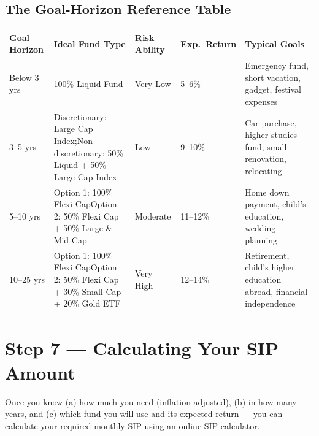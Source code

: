 \documentclass[12pt,a4paper]{article}
\begin{document}
\vspace{3mm}

\subsection{The Goal-Horizon Reference Table}

\begin{center}
\renewcommand{\arraystretch}{1.4}
\begin{tabular}{B{2.4cm} L{4.8cm} L{1.9cm} L{1.8cm} L{3.4cm}}
\toprule
\textbf{Goal Horizon} & \textbf{Ideal Fund Type} & \textbf{Risk Ability} & \textbf{Exp.\ Return} & \textbf{Typical Goals}\\
\midrule
{}
Below 3 yrs
& 100\% Liquid Fund
& Very Low
& 5--6\%
& Emergency fund, short vacation, gadget, festival expenses\\[3pt]

3--5 yrs
& Discretionary: Large Cap Index;\newline Non-discretionary: 50\% Liquid + 50\% Large Cap Index
& Low
& 9--10\%
& Car purchase, higher studies fund, small renovation, relocating\\[3pt]

5--10 yrs
& Option 1: 100\% Flexi Cap\newline Option 2: 50\% Flexi Cap + 50\% Large \& Mid Cap
& Moderate
& 11--12\%
& Home down payment, child's education, wedding planning\\[3pt]

10--25 yrs
& Option 1: 100\% Flexi Cap\newline Option 2: 50\% Flexi Cap + 30\% Small Cap + 20\% Gold ETF
& Very High
& 12--14\%
& Retirement, child's higher education abroad, financial independence\\
\bottomrule
\end{tabular}
\end{center}

\section{Step 7 --- Calculating Your SIP Amount}

Once you know (a) how much you need (inflation-adjusted), (b) in how many years, and (c) which fund you will use and its expected return --- you can calculate your required monthly SIP using an online SIP calculator.
\end{document}
